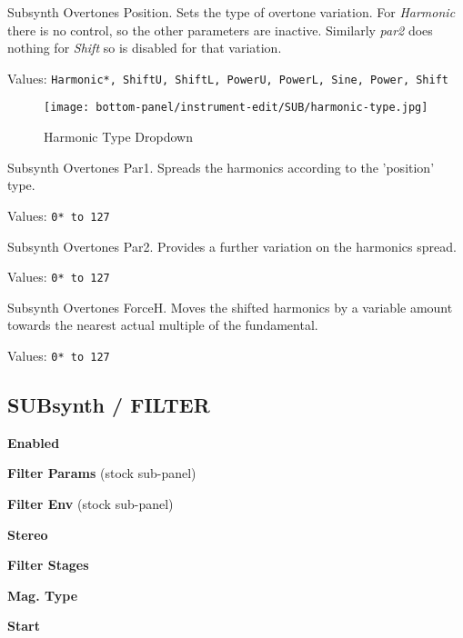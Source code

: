    \setcounter{ItemCounter}{0}      %

   Subsynth Overtones Position.
   Sets the type of overtone variation. For \textsl{Harmonic} there is no
   control, so the other parameters are inactive. Similarly \textsl{par2} does
   nothing for \textsl{Shift} so is disabled for that variation.

   Values: \texttt{Harmonic*, ShiftU, ShiftL, PowerU, PowerL, Sine, Power, Shift}

\begin{figure}[H]
   \centering
   \texttt{[image: bottom-panel/instrument-edit/SUB/harmonic-type.jpg]}
   \caption{Harmonic Type Dropdown}
   \label{fig:harmonic_type_dropdown}
\end{figure}

   Subsynth Overtones Par1.
   Spreads the harmonics according to the 'position' type.

   Values: \texttt{0* to 127}

   Subsynth Overtones Par2.
   Provides a further variation on the harmonics spread.

   Values: \texttt{0* to 127}

   Subsynth Overtones ForceH.
   Moves the shifted harmonics by a variable amount towards the nearest actual
   multiple of the fundamental.

   Values: \texttt{0* to 127}

\subsection{SUBsynth / FILTER}
\label{subsec:subsynth_filter}

   \begin{enumber}
      \item \textbf{Enabled}
      \item \textbf{Filter Params} (stock sub-panel)
      \item \textbf{Filter Env} (stock sub-panel)
      \item \textbf{Stereo}
      \item \textbf{Filter Stages}
      \item \textbf{Mag. Type}
      \item \textbf{Start}
   \end{enumber}

